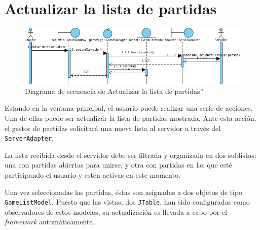 \section{Actualizar la lista de partidas}

\begin{figure}[ht]
\centering
\includegraphics[scale=0.6]{img/ch03devel-listgames.png}
\caption{Diagrama de secuencia de Actualizar la lista de partidas''}
\end{figure}

Estando en la ventana principal, el usuario puede realizar una serie de
acciones. Una de ellas puede ser actualizar la lista de partidas mostrada. Ante
esta acción, el gestor de partidas solicitará una nueva lista al servidor a
través del \texttt{ServerAdapter}.

La lista recibida desde el servidor debe ser filtrada y organizada en dos
sublistas: una con partidas abiertas para unirse, y otra con partidas en las
que esté participando el usuario y estén activas en este momento.

Una vez seleccionadas las partidas, éstas son asignadas a dos objetos de tipo
\texttt{GameListModel}. Puesto que las vistas, dos \texttt{JTable}, han sido
configuradas como observadores de estos modelos, su actualización es llevada a
cabo por el \textit{framework} automáticamente.
